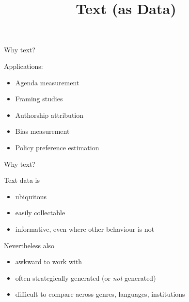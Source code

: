 \documentclass{hertieteaching}
\title{Text (as Data)}
\begin{document}
\maketitle


\begin{frame}{Why text?}

Applications:
\begin{itemize}
  \item Agenda measurement \cite[e.g.][]{Grimmer.etal2011}
  \item Framing studies \cite[e.g.][]{Gamson.Modigliani1989}
  \item Authorship attribution \cite[e.g.][]{Mosteller.Wallace1963}
  \item Bias measurement \cite[e.g.][]{Caliskan.etal2017}
  \item Policy preference estimation \parencite[e.g.][]{Laver.etal2003}
\end{itemize}

\end{frame}
\begin{frame}{Why text?}
  
Text data is 
\begin{itemize}
  \item ubiquitous
  \item easily collectable
  \item informative, even where other behaviour is not
\end{itemize}

\pause

Nevertheless also
\begin{itemize}
  \item awkward to work with
  \item often strategically generated (or \textit{not} generated)
  \item difficult to compare across genres, languages, institutions
\end{itemize}

\end{frame}
\end{document}
